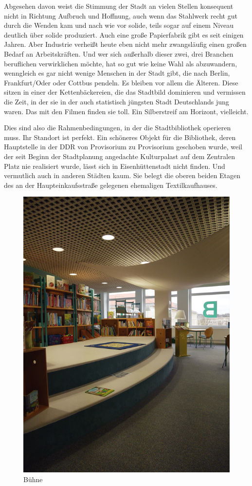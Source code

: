 \documentclass[a4paper,
fontsize=11pt,
oneside,
numbers=noperiodatend,
parskip=half-,
bibliography=totoc,
final
]{scrartcl}
\begin{document}
Abgesehen davon weist die Stimmung der Stadt an vielen Stellen
konsequent nicht in Richtung Aufbruch und Hoffnung, auch wenn das
Stahlwerk recht gut durch die Wenden kam und nach wie vor solide, teils
sogar auf einem Niveau deutlich über solide produziert. Auch eine große
Papierfabrik gibt es seit einigen Jahren. Aber Industrie verheißt heute
eben nicht mehr zwangsläufig einen großen Bedarf an Arbeitskräften. Und
wer sich außerhalb dieser zwei, drei Branchen beruflichen verwirklichen
möchte, hat so gut wie keine Wahl als abzuwandern, wenngleich es gar
nicht wenige Menschen in der Stadt gibt, die nach Berlin, Frankfurt/Oder
oder Cottbus pendeln. Es bleiben vor allem die Älteren. Diese sitzen in
einer der Kettenbäckereien, die das Stadtbild dominieren und vermissen
die Zeit, in der sie in der auch statistisch jüngsten Stadt Deutschlands
jung waren. Das mit den Filmen finden sie toll. Ein Silberstreif am
Horizont, vielleicht.

Dies sind also die Rahmenbedingungen, in der die Stadtbibliothek
operieren muss. Ihr Standort ist perfekt. Ein schöneres Objekt für die
Bibliothek, deren Hauptstelle in der DDR von Provisorium zu Provisorium
geschoben wurde, weil der seit Beginn der Stadtplanung angedachte
Kulturpalast auf dem Zentralen Platz nie realisiert wurde, lässt sich in
Eisenhüttenstadt nicht finden. Und vermutlich auch in anderen Städten
kaum. Sie belegt die oberen beiden Etagen des an der Haupteinkaufsstraße
gelegenen ehemaligen Textilkaufhauses.

\begin{figure}
\centering
\includegraphics{img/image_2.jpg}
\caption{Bühne}
\end{figure}
\end{document}
